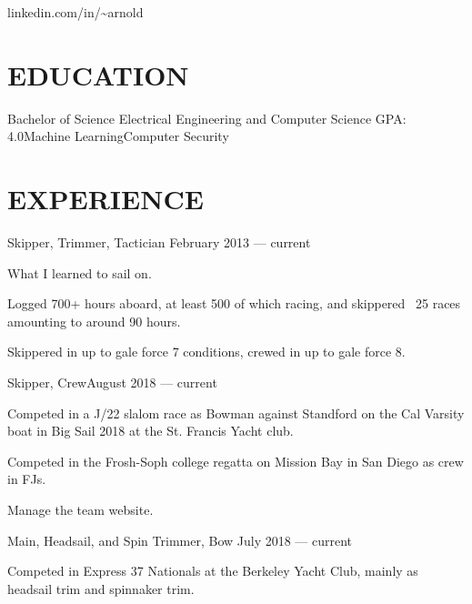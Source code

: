 \documentclass[10pt]{article}
\begin{document}
				 {linkedin.com/in/{\textasciitilde}arnold}      

\section*{EDUCATION}

    {Bachelor of Science {\textendash} Electrical Engineering and Computer Science}
{GPA: 4.0}{Machine Learning}{Computer Security}


\section*{EXPERIENCE}

								{Skipper, Trimmer, Tactician}
								{February 2013 --- current}                  		
                \begin{accomplishments}
                \item What I learned to sail on. 
                \item Logged 700+ hours aboard, at least 500 of which racing, and skippered ~25 races amounting to around 90 hours.
                \item Skippered in up to gale force 7 conditions, crewed in up to gale force 8. 
                 \end{accomplishments}
	                    		
        {Skipper, Crew}{August 2018 --- current}
              \begin{accomplishments}					        
              \item Competed in a J/22 slalom race as Bowman against Standford on the Cal Varsity boat in Big Sail 2018 at the St. Francis Yacht club.
                \item Competed in the Frosh-Soph college regatta on Mission Bay in San Diego as crew in FJs.
                \item Manage the team website.
               \end{accomplishments}
	   		
                {Main, Headsail, and Spin Trimmer, Bow}
                {July 2018 --- current}
                \begin{accomplishments}
                \item Competed in Express 37 Nationals at the Berkeley Yacht Club, mainly as headsail trim and spinnaker trim.
                \end{accomplishments}
\end{document}

